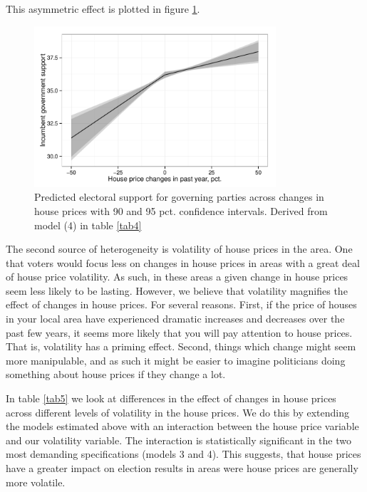 \documentclass[12pt,a4paper]{article}
\begin{document}


This asymmetric effect is plotted in figure \ref{posneg}.

\begin{figure}[htbp]
	\includegraphics[page=1,width=0.8\textwidth]{../figures/posnegplot}
	\centering
	\caption{Predicted electoral support for governing parties across changes in house prices with 90 and 95 pct. confidence intervals. Derived from model (4) in table \ref{tab4}}
	\label{posneg}
\end{figure}


The second source of heterogeneity is volatility of house prices in the area. One that voters would focus less on changes in house prices in areas with a great deal of house price volatility. As such, in these areas a given change in house prices seem less likely to be lasting. However, we believe that volatility magnifies the effect of changes in house prices. For several reasons. First, if the price of houses in your local area have experienced dramatic increases and decreases  over the past few years, it seems more likely that you will pay attention to house prices. That is, volatility has a priming effect. Second, things which change might seem more manipulable, and as such it might be easier to imagine politicians doing something about house prices if they change a lot. 


 In table \ref{tab5} we look at differences in the effect of changes in house prices across different levels of volatility in the house prices.  We do this by extending the models estimated above with an interaction between the house price variable and our volatility variable. The interaction is statistically significant in the two most demanding specifications (models 3 and 4). This suggests, that house prices have a greater impact on election results in areas were house prices are generally more volatile. 
\end{document}

